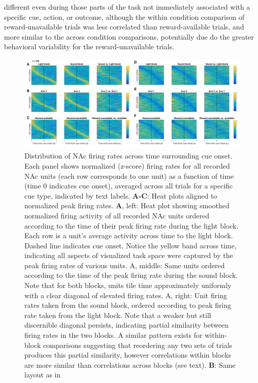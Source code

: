 \documentclass[11pt]{article}
\newcommand{\bsf}[1]{\textbf{#1}}
\begin{document}
different even during those parts of the task not immediately associated with a
specific cue, action, or outcome, although the within condition comparison of
reward-unavailable trials was less correlated than reward-available trials, and
more similar to the across condition comparisons, potentially due do the greater behavioral variability for the reward-unavailable trials.

 \begin{figure}[ht!]
\centering
\includegraphics[width=\textwidth]{Fig 8 - Task tiling.pdf}
\caption{Distribution of NAc firing rates across time surrounding cue
onset. Each panel shows normalized (z-score) firing rates for all recorded NAc
units (each row corresponds to one unit) as a function of time (time 0
indicates cue onset), averaged across all trials for a specific cue type,
indicated by text labels. \bsf{A-C}: Heat plots aligned to normalized peak
firing rates. \bsf{A}, left: Heat plot showing smoothed normalized firing
activity of all recorded NAc units ordered according to the time of their peak
firing rate during the light block. Each row is a unit’s average activity
across time to the light block. Dashed line indicates cue onset. Notice the
yellow band across time, indicating all aspects of visualized task space were
captured by the peak firing rates of various units. A, middle: Same units
ordered according to the time of the peak firing rate during the sound
block. Note that for both blocks, units tile time approximately uniformly with
a clear diagonal of elevated firing rates. A, right: Unit firing rates
taken from the sound block, ordered according to peak firing rate taken from
the light block. Note that a weaker but still discernible diagonal persists,
indicating partial similarity between firing rates in the two blocks. A similar pattern exists for within-block comparisons suggesting that reordering any two sets of trials
produces this partial similarity, however correlations within blocks are more
similar than correlations across blocks (see text). \bsf{B}: Same layout as in
}
\end{figure}
\end{document}
